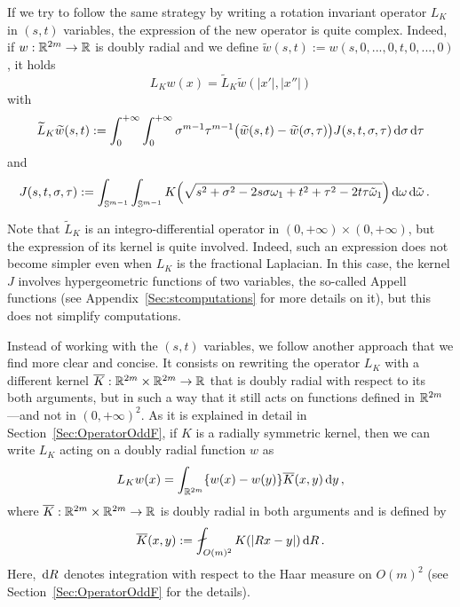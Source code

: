  If we try to follow the same strategy by writing a rotation invariant operator $L_K$ in $(s,t)$ variables, the expression of the new operator is quite complex. Indeed, if $w:\mathbb{R}^{2m} \to \mathbb{R}$ is doubly radial and we define $\widetilde{w}(s,t) := w(s,0,...,0,t,0,...,0)$, it holds
$$ L_Kw(x) = \widetilde{L}_K \widetilde{w} (|x'|,|x''|)$$
with
\begin{equation}
	\label{Eq:L_K-st}
	\widetilde{L}_K \widetilde{w} (s,t) := \int_0^{+\infty}  \int_0^{+\infty} \sigma^{m-1} \tau^{m-1} \big(\widetilde{w}(s,t) - \widetilde{w}(\sigma, \tau)\big) J(s,t,\sigma, \tau)  \,\mathrm{d} \sigma\,\mathrm{d} \tau
\end{equation}
and
\begin{align*}
J(s,t,\sigma, \tau) &:= \int_{\mathbb{S}^{m-1}}  \int_{\mathbb{S}^{m-1}} K\Big( \sqrt{s^2+\sigma^2- 2 s \sigma \omega_1 + t^2 + \tau^2 - 2t \tau\tilde\omega_1}\Big) \,\mathrm{d} \omega \,\mathrm{d} \tilde\omega\,.
\end{align*}

Note that $\widetilde{L}_K$ is an integro-differential operator in $(0,+\infty)\times(0,+\infty)$, but the expression of its kernel is quite involved. Indeed, such an expression does not become simpler even when $L_K$ is the fractional Laplacian. In this case, the kernel $J$ involves hypergeometric functions of two variables, the so-called Appell functions (see Appendix~\ref{Sec:stcomputations} for more details on it), but this does not simplify computations. 



Instead of working with the $(s,t)$ variables, we follow another approach that we find more clear and concise. It consists on rewriting the operator $L_K$ with a different kernel $\overline{K} : \mathbb{R}^{2m}\times \mathbb{R}^{2m} \to \mathbb{R}$ that is doubly radial with respect to its both arguments, but in such a way that it still acts on functions defined in $\mathbb{R}^{2m}$ ---and not in $(0,+\infty)^2$. As it is explained in detail in Section~\ref{Sec:OperatorOddF}, if $K$ is a radially symmetric kernel, then we can write $L_K$ acting on a doubly radial function $w$ as
\begin{equation}
\label{Eq:L_KWithKbar}
L_K w(x) = \int_{\mathbb{R}^{2m}} \{w(x) - w(y)\} \overline{K}(x,y) \,\mathrm{d} y\,,
\end{equation}
where $\overline{K} : \mathbb{R}^{2m}\times \mathbb{R}^{2m} \to \mathbb{R}$ is doubly radial in both arguments and is defined by
\begin{equation}
\label{Eq:KbarDef'}
\overline{K}(x,y) := \average_{O(m)^2} K(|Rx - y|)\d R\,.
\end{equation}
Here, $\,\mathrm{d} R$ denotes integration with respect to the Haar measure on $O(m)^2$ (see Section~\ref{Sec:OperatorOddF} for the details).

